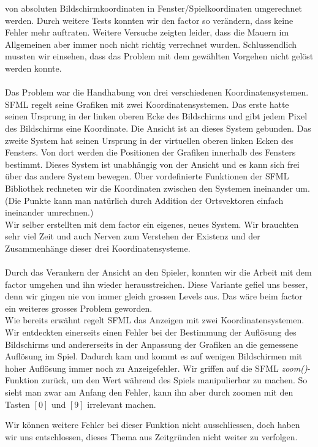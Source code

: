 \documentclass[11pt,a4paper]{scrbook}
\newcommand{\key}[1]{$[#1]$}
\begin{document}
von absoluten Bildschirmkoordinaten in Fenster/Spielkoordinaten umgerechnet werden. 
Durch weitere Tests konnten wir den factor so verändern, dass keine Fehler mehr auftraten. 
Weitere Versuche zeigten leider, dass die Mauern im Allgemeinen aber immer noch nicht richtig verrechnet wurden.
Schlussendlich mussten wir einsehen, dass das Problem mit dem gewählten Vorgehen nicht gelöst werden konnte.\\
\\
Das Problem war die Handhabung von drei verschiedenen Koordinatensystemen.
SFML regelt seine Grafiken mit zwei Koordinatensystemen.
Das erste hatte seinen Ursprung in der linken oberen Ecke des Bildschirms und gibt jedem Pixel des Bildschirms eine Koordinate.
Die Ansicht ist an dieses System gebunden.
Das zweite System hat seinen Ursprung in der virtuellen oberen linken Ecken des Fensters.
Von dort werden die Positionen der Grafiken innerhalb des Fensters bestimmt.
Dieses System ist unabhängig von der Ansicht und es kann sich frei über das andere System bewegen.
Über vordefinierte Funktionen der SFML Bibliothek rechneten wir die Koordinaten zwischen den Systemen ineinander um.
\\
(Die Punkte kann man natürlich durch Addition der Ortsvektoren einfach ineinander umrechnen.)
\\
Wir selber erstellten mit dem factor ein eigenes, neues System.
Wir brauchten sehr viel Zeit und auch Nerven zum Verstehen der Existenz und der Zusammenhänge dieser drei Koordinatensysteme.\\
\\
Durch das Verankern der Ansicht an den Spieler, konnten wir die Arbeit mit dem factor umgehen und ihn wieder herausstreichen.
Diese Variante gefiel uns besser, denn wir gingen nie von immer gleich grossen Levels aus. 
Das wäre beim factor ein weiteres grosses Problem geworden.
\\
Wie bereits erwähnt regelt SFML das Anzeigen mit zwei Koordinatensystemen. Wir entdeckten einerseits einen Fehler bei der Bestimmung der Auflösung des Bildschirms und andererseits in der Anpassung der Grafiken an die gemessene Auflösung im Spiel.
Dadurch kam und kommt es auf wenigen Bildschirmen mit hoher Auflösung immer noch zu Anzeigefehler. Wir griffen auf die SFML \textit{zoom()}-Funktion zurück, um den Wert während des Spiels manipulierbar zu machen. So sieht man zwar am Anfang den Fehler, kann ihn aber durch zoomen mit den Tasten \key{0} und \key{9} irrelevant machen.

Wir können weitere Fehler bei dieser Funktion nicht ausschliessen, doch haben wir uns entschlossen, dieses Thema aus Zeitgründen nicht weiter zu verfolgen. 
\end{document}

